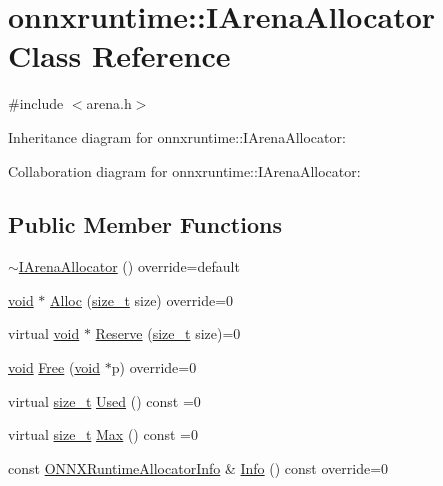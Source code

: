 \hypertarget{classonnxruntime_1_1IArenaAllocator}{}\section{onnxruntime\+:\+:I\+Arena\+Allocator Class Reference}
\label{classonnxruntime_1_1IArenaAllocator}


{\ttfamily \#include $<$arena.\+h$>$}



Inheritance diagram for onnxruntime\+:\+:I\+Arena\+Allocator\+:


Collaboration diagram for onnxruntime\+:\+:I\+Arena\+Allocator\+:
\subsection*{Public Member Functions}
\begin{DoxyCompactItemize}
\item 
\mbox{\hyperlink{classonnxruntime_1_1IArenaAllocator_a6776ce827e24f8a87c9076fe6742d6e5}{$\sim$\+I\+Arena\+Allocator}} () override=default
\item 
\mbox{\hyperlink{mlasi_8h_a88f941d423cb2a819b70a1358982b1a6}{void}} $\ast$ \mbox{\hyperlink{classonnxruntime_1_1IArenaAllocator_a879507b0ec3b184d9bb60281191b8cd6}{Alloc}} (\mbox{\hyperlink{mlasi_8h_a503efbc1c6e50825320ad909366b78ab}{size\+\_\+t}} size) override=0
\item 
virtual \mbox{\hyperlink{mlasi_8h_a88f941d423cb2a819b70a1358982b1a6}{void}} $\ast$ \mbox{\hyperlink{classonnxruntime_1_1IArenaAllocator_ae39a9a84e17eb83bb779149fb212004a}{Reserve}} (\mbox{\hyperlink{mlasi_8h_a503efbc1c6e50825320ad909366b78ab}{size\+\_\+t}} size)=0
\item 
\mbox{\hyperlink{mlasi_8h_a88f941d423cb2a819b70a1358982b1a6}{void}} \mbox{\hyperlink{classonnxruntime_1_1IArenaAllocator_a3341fde74c8461678359fb903fe78df3}{Free}} (\mbox{\hyperlink{mlasi_8h_a88f941d423cb2a819b70a1358982b1a6}{void}} $\ast$p) override=0
\item 
virtual \mbox{\hyperlink{mlasi_8h_a503efbc1c6e50825320ad909366b78ab}{size\+\_\+t}} \mbox{\hyperlink{classonnxruntime_1_1IArenaAllocator_aa6b6994640f86749998ffd0c5da4dd83}{Used}} () const =0
\item 
virtual \mbox{\hyperlink{mlasi_8h_a503efbc1c6e50825320ad909366b78ab}{size\+\_\+t}} \mbox{\hyperlink{classonnxruntime_1_1IArenaAllocator_a09710487a52f42135ee804b7d2e2ed71}{Max}} () const =0
\item 
const \mbox{\hyperlink{structONNXRuntimeAllocatorInfo}{O\+N\+N\+X\+Runtime\+Allocator\+Info}} \& \mbox{\hyperlink{classonnxruntime_1_1IArenaAllocator_a4eb52bb1236cf59aec91161156286ba0}{Info}} () const override=0
\end{DoxyCompactItemize}
